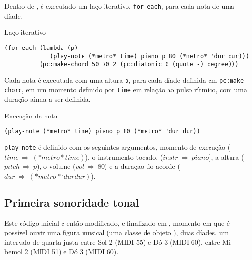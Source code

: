 Dentro de , é executado um laço iterativo, \verb|for-each|, para cada nota de uma díade.

\begin{example}{Laço iterativo}\label{sec:iterativo}
\begin{verbatim}
(for-each (lambda (p)
             (play-note (*metro* time) piano p 80 (*metro* 'dur dur)))                                 
          (pc:make-chord 50 70 2 (pc:diatonic 0 (quote -) degree)))
\end{verbatim}
\end{example}

Cada nota é executada com uma altura \verb|p|, para cada díade definida em \verb|pc:make-chord|, em um momento definido por \verb|time| em relação ao pulso rítmico, com uma duração ainda a ser definida. 

\begin{example}{Execução da nota}
\begin{verbatim}
(play-note (*metro* time) piano p 80 (*metro* 'dur dur))
\end{verbatim}
\end{example}

\verb|play-note| é definido com os seguintes argumentos, momento de execução ($time~\Rightarrow~(*metro* time)$), o instrumento tocado, ($instr~\Rightarrow~piano$), a altura ($pitch~\Rightarrow~p$), o volume ($vol~\Rightarrow~80$) e a duração do acorde ($dur~\Rightarrow~(*metro* 'dur dur)$). 

\subsection{Primeira sonoridade tonal}\label{sec:1aSonoridade}

Este código inicial é então modificado, e finalizado em , momento em que é possível ouvir uma figura musical (uma classe de objeto ), duas díades, um intervalo de quarta justa entre Sol 2 (MIDI 55) e Dó 3 (MIDI 60). entre Mi bemol 2 (MIDI 51) e Dó 3 (MIDI 60).

